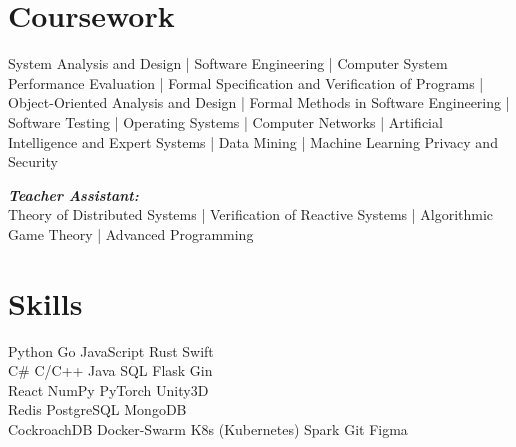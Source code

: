 \documentclass[letterpaper]{deedy-resume} %
\begin{document}
\begin{minipage}[t]{0.33\textwidth}
%
%


\section{Coursework}
System Analysis and Design |
Software Engineering |
Computer System Performance Evaluation |
Formal Specification and Verification of Programs |
Object-Oriented Analysis and Design |
Formal Methods in Software Engineering |
Software Testing |
Operating Systems |
Computer Networks |
Artificial Intelligence and Expert Systems |
Data Mining | Machine Learning Privacy and Security

{\footnotesize \textit{\textbf{Teacher Assistant: }}} \\

Theory of Distributed Systems |
Verification of Reactive Systems |
Algorithmic Game Theory |
Advanced Programming

\sectionspace %


\section{Skills}
Python \textbullet{} Go \textbullet{} JavaScript \textbullet{} Rust \textbullet{} Swift \\ %
C\# \textbullet{} C/C++ \textbullet{} Java \textbullet{} SQL \textbullet{} Flask \textbullet{} Gin \\ %
React \textbullet{} NumPy \textbullet{} PyTorch \textbullet{} Unity3D \\ %
Redis \textbullet{} PostgreSQL \textbullet{} MongoDB \\ %
CockroachDB \textbullet{} Docker-Swarm \textbullet{} K8s (Kubernetes) \textbullet{} Spark \textbullet{} Git \textbullet{} Figma
\sectionspace %


\end{minipage} %
\end{document}
